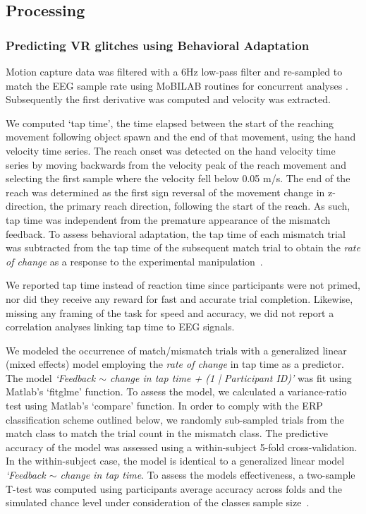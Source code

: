 \subsection{Processing}

\subsubsection{Predicting VR glitches using Behavioral Adaptation}

Motion capture data was filtered with a 6Hz low-pass filter and re-sampled to match the EEG sample rate using MoBILAB routines for concurrent analyses \cite{Ojeda2014-ev}. Subsequently the first derivative was computed and velocity was extracted. 

We computed `tap time', the time elapsed between the start of the reaching movement following object spawn and the end of that movement, using the hand velocity time series. The reach onset was detected on the hand velocity time series by moving backwards from the velocity peak of the reach movement and selecting the first sample where the velocity fell below 0.05 m/s. The end of the reach was determined as the first sign reversal of the movement change in z-direction, the primary reach direction, following the start of the reach. As such, tap time was independent from the premature appearance of the mismatch feedback. To assess behavioral adaptation, the tap time of each mismatch trial was subtracted from the tap time of the subsequent match trial to obtain the \textit{rate of change} as a response to the experimental manipulation~\cite{Dutilh2012-ps}.

We reported tap time instead of reaction time since participants were not primed, nor did they receive any reward for fast and accurate trial completion. Likewise, missing any framing of the task for speed and accuracy, we did not report a correlation analyses linking tap time to EEG signals.

We modeled the occurrence of match/mismatch trials with a generalized linear (mixed effects) model employing the \textit{rate of change} in tap time as a predictor. The model \textit{`Feedback $\sim$ change in tap time + (1 | Participant ID)'} was fit using Matlab's `fitglme' function. To assess the model, we calculated a variance-ratio test using Matlab's `compare' function. In order to comply with the ERP classification scheme outlined below, we randomly sub-sampled trials from the match class to match the trial count in the mismatch class. The predictive accuracy of the model was assessed using a within-subject 5-fold cross-validation. In the within-subject case, the model is identical to a generalized linear model \textit{`Feedback $\sim$ change in tap time}. To assess the models effectiveness, a two-sample T-test was computed using participants average accuracy across folds and the simulated chance level under consideration of the classes sample size~\cite{Muller-Putz2007-oc}.

